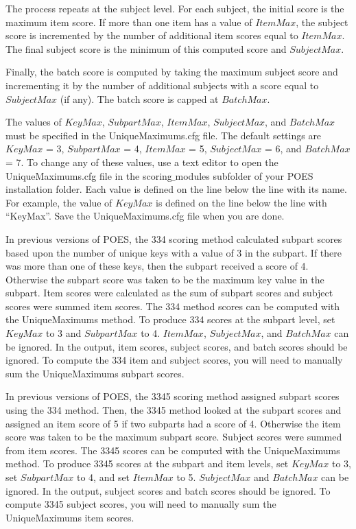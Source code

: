 \documentclass[11pt]{article}
\numberwithin{figure}{section}
\numberwithin{table}{section}
\begin{document}
The process repeats at the subject level.  For each subject, the initial score is the maximum item score.
If more than one item has a value of $ItemMax$, the subject score is incremented by the number of additional item scores equal to $ItemMax$.  The final subject score is the minimum of this computed score and $SubjectMax$.

Finally, the batch score is computed by taking the maximum subject score and incrementing it by the number of additional subjects with a score equal to $SubjectMax$ (if any).  The batch score is capped at $BatchMax$.

The values of $KeyMax$, $SubpartMax$, $ItemMax$, $SubjectMax$, and $BatchMax$ must be specified in the UniqueMaximums.cfg file.  The default settings are $KeyMax$ = 3, $SubpartMax$ = 4, $ItemMax$ = 5, $SubjectMax$ = 6, and $BatchMax$ = 7.  To change any of these values, use a text editor to open the UniqueMaximums.cfg file in the scoring$\_$modules subfolder of your POES installation folder.  Each value is defined on the line below the line with its name. For example, the value of $KeyMax$ is defined on the line below the line with ``KeyMax''.  Save the UniqueMaximums.cfg file when you are done.

In previous versions of POES, the 334 scoring method calculated subpart scores based upon the number of unique keys with a value of 3 in the subpart.  If there was more than one of these keys, then the subpart received a score of 4.  Otherwise the subpart score was taken to be the maximum key value in the subpart.  Item scores were calculated as the sum of subpart scores and subject scores were summed item scores. The 334 method scores can be computed with the UniqueMaximums method.  To produce 334 scores at the subpart level, set $KeyMax$ to 3 and $SubpartMax$ to 4.  $ItemMax$, $SubjectMax$, and $BatchMax$ can be ignored.  In the output, item scores, subject scores, and batch scores should be ignored.  To compute the 334 item and subject scores, you will need to manually sum the UniqueMaximums subpart scores.

In previous versions of POES, the 3345 scoring method assigned subpart scores using the 334 method.  Then, the 3345 method looked at the subpart scores and assigned an item score of 5 if two subparts had a score of 4.  Otherwise the item score was taken to be the maximum subpart score.  Subject scores were summed from item scores.  The 3345 scores can be computed with the UniqueMaximums method.  To produce 3345 scores at the subpart and item levels, set $KeyMax$ to 3, set $SubpartMax$ to 4, and set $ItemMax$ to 5. $SubjectMax$ and $BatchMax$ can be ignored.  In the output, subject scores and batch scores should be ignored.  To compute 3345 subject scores, you will need to manually sum the UniqueMaximums item scores.
\end{document}
